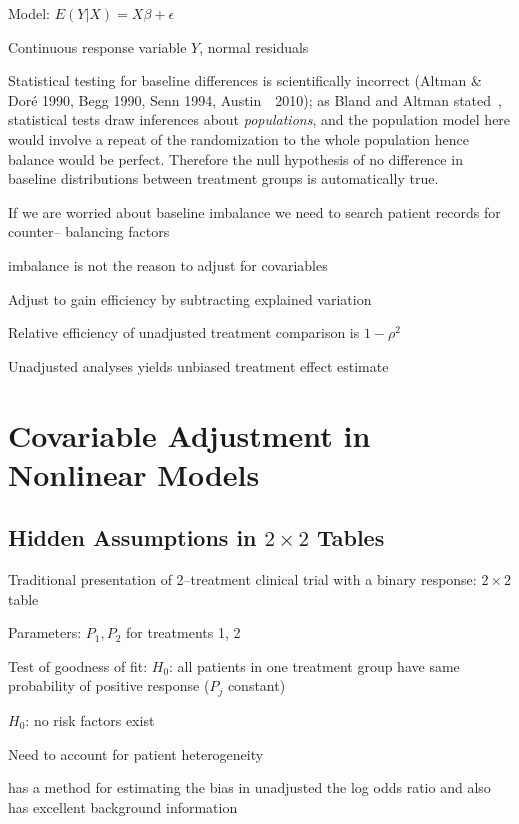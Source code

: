 \bi
\item   Model: $E(Y | X) = X \beta + \epsilon$
\item   Continuous response variable $Y$, normal residuals
\item   Statistical testing for baseline differences is scientifically
        incorrect (Altman \& Dor\'{e} 1990, Begg 1990, Senn 1994,
        Austin~\etal\ 2010); as Bland and Altman
        stated~\cite{bla11com}, statistical tests draw inferences
        about \emph{populations}, and the population model here would
        involve a repeat of the randomization to the whole population
        hence balance would be perfect.  Therefore the null hypothesis of no
        difference in baseline distributions between treatment groups
        is automatically true.
\item   If we are worried about baseline imbalance we need to search
        patient records for counter-- balancing factors
\item   \ra imbalance is not the reason to adjust for covariables
\item   Adjust to gain efficiency by subtracting explained variation
\item   Relative efficiency of unadjusted treatment comparison is $1-\rho^2$
\item   Unadjusted analyses yields unbiased treatment effect estimate
\ei

\section{Covariable Adjustment in Nonlinear Models}
\subsection{Hidden Assumptions in $2 \times 2$ Tables}
\bi
\item   Traditional presentation of 2--treatment clinical trial with a
        binary response: $2 \times 2$ table
\item   Parameters: $P_{1}, P_{2}$ for treatments 1, 2
\item   Test of goodness of fit: $H_0$: all patients in one treatment
        group have same probability of positive response ($P_j$ constant)
\item   \ra $H_0$: no risk factors exist
\item   Need to account for patient heterogeneity
\item   \cite{mat15inc} has a method for estimating the bias in
  unadjusted the log odds ratio and also has excellent background information
\ei

